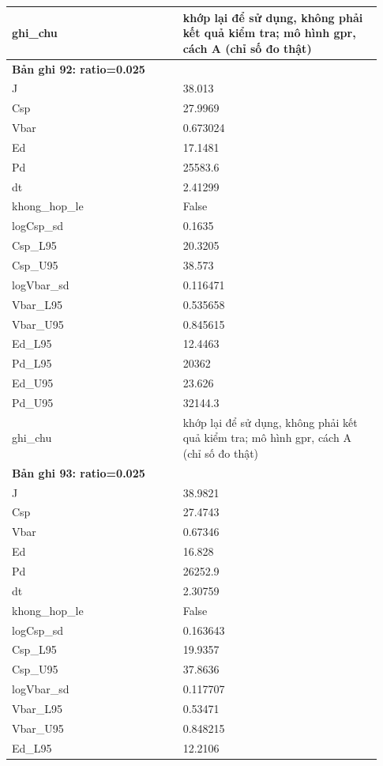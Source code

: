 \begin{longtable}{p{0.43\linewidth}p{0.50\linewidth}}
ghi\_\allowbreak chu & khớp lại để sử dụng, không phải kết quả kiểm tra; mô hình gpr, cách A (chỉ số đo thật) \\
\midrule
\multicolumn{2}{p{0.95\linewidth}}{\textbf{Bản ghi 92: ratio=0.025}} \\
J & 38.013 \\
Csp & 27.9969 \\
Vbar & 0.673024 \\
Ed & 17.1481 \\
Pd & 25583.6 \\
dt & 2.41299 \\
khong\_\allowbreak hop\_\allowbreak le & False \\
logCsp\_\allowbreak sd & 0.1635 \\
Csp\_\allowbreak L95 & 20.3205 \\
Csp\_\allowbreak U95 & 38.573 \\
logVbar\_\allowbreak sd & 0.116471 \\
Vbar\_\allowbreak L95 & 0.535658 \\
Vbar\_\allowbreak U95 & 0.845615 \\
Ed\_\allowbreak L95 & 12.4463 \\
Pd\_\allowbreak L95 & 20362 \\
Ed\_\allowbreak U95 & 23.626 \\
Pd\_\allowbreak U95 & 32144.3 \\
ghi\_\allowbreak chu & khớp lại để sử dụng, không phải kết quả kiểm tra; mô hình gpr, cách A (chỉ số đo thật) \\
\midrule
\multicolumn{2}{p{0.95\linewidth}}{\textbf{Bản ghi 93: ratio=0.025}} \\
J & 38.9821 \\
Csp & 27.4743 \\
Vbar & 0.67346 \\
Ed & 16.828 \\
Pd & 26252.9 \\
dt & 2.30759 \\
khong\_\allowbreak hop\_\allowbreak le & False \\
logCsp\_\allowbreak sd & 0.163643 \\
Csp\_\allowbreak L95 & 19.9357 \\
Csp\_\allowbreak U95 & 37.8636 \\
logVbar\_\allowbreak sd & 0.117707 \\
Vbar\_\allowbreak L95 & 0.53471 \\
Vbar\_\allowbreak U95 & 0.848215 \\
Ed\_\allowbreak L95 & 12.2106 \\

\end{longtable}
